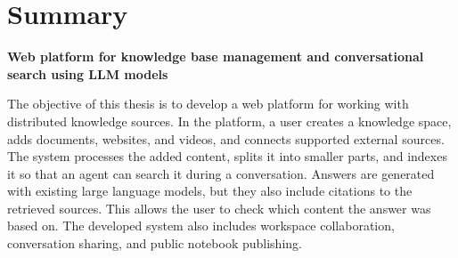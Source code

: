 \section*{\fontsize{18}{17}\selectfont Summary}
\ifdiffversion
\fi
\noindent\textbf{\fontsize{14}{17}\selectfont Web platform for knowledge base management and conversational search using LLM models}

The objective of this thesis is to develop a web platform for working with distributed knowledge sources. In the platform, a user creates a knowledge space, adds documents, websites, and videos, and connects supported external sources. The system processes the added content, splits it into smaller parts, and indexes it so that an agent can search it during a conversation. Answers are generated with existing large language models, but they also include citations to the retrieved sources. This allows the user to check which content the answer was based on. The developed system also includes workspace collaboration, conversation sharing, and public notebook publishing.

\vspace{0.5cm}

\newpage
